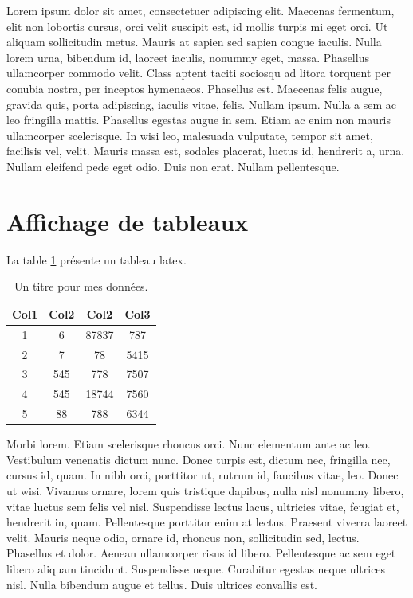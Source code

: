 Lorem ipsum dolor sit amet, consectetuer adipiscing elit. Maecenas fermentum, elit non lobortis cursus, orci velit suscipit est, id mollis turpis mi eget orci. Ut aliquam sollicitudin metus. Mauris at sapien sed sapien congue iaculis. Nulla lorem urna, bibendum id, laoreet iaculis, nonummy eget, massa. Phasellus ullamcorper commodo velit. Class aptent taciti sociosqu ad litora torquent per conubia nostra, per inceptos hymenaeos. Phasellus est. Maecenas felis augue, gravida quis, porta adipiscing, iaculis vitae, felis. Nullam ipsum. Nulla a sem ac leo fringilla mattis. Phasellus egestas augue in sem. Etiam ac enim non mauris ullamcorper scelerisque. In wisi leo, malesuada vulputate, tempor sit amet, facilisis vel, velit. Mauris massa est, sodales placerat, luctus id, hendrerit a, urna. Nullam eleifend pede eget odio. Duis non erat. Nullam pellentesque.


\section{Affichage de tableaux}

La table \ref{table:matable1} présente un tableau latex.


\begin{table}[!h]
   \begin{center}
   \begin{tabular}{||c c c c||} 
    \hline
    Col1 & Col2 & Col2 & Col3 \\ [0.5ex] 
    \hline\hline
    1 & 6 & 87837 & 787 \\ 
    \hline
    2 & 7 & 78 & 5415 \\
    \hline
    3 & 545 & 778 & 7507 \\
    \hline
    4 & 545 & 18744 & 7560 \\
    \hline
    5 & 88 & 788 & 6344 \\ [1ex] 
    \hline
   \end{tabular}
   \end{center}
   \caption{Un titre pour mes données.}
   \label{table:matable1}
\end{table}

Morbi lorem. Etiam scelerisque rhoncus orci. Nunc elementum ante ac leo. Vestibulum venenatis dictum nunc. Donec turpis est, dictum nec, fringilla nec, cursus id, quam. In nibh orci, porttitor ut, rutrum id, faucibus vitae, leo. Donec ut wisi. Vivamus ornare, lorem quis tristique dapibus, nulla nisl nonummy libero, vitae luctus sem felis vel nisl. Suspendisse lectus lacus, ultricies vitae, feugiat et, hendrerit in, quam. Pellentesque porttitor enim at lectus. Praesent viverra laoreet velit. Mauris neque odio, ornare id, rhoncus non, sollicitudin sed, lectus. Phasellus et dolor. Aenean ullamcorper risus id libero. Pellentesque ac sem eget libero aliquam tincidunt. Suspendisse neque. Curabitur egestas neque ultrices nisl. Nulla bibendum augue et tellus. Duis ultrices convallis est.

